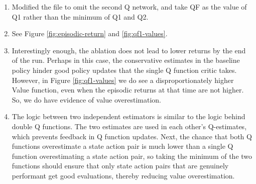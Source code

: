 \documentclass[11pt]{article}
\begin{document}
\begin{enumerate}
    \item[(a)] Modified the file to omit the second Q network, and take QF as the value of Q1 rather than the minimum of Q1 and Q2.
    \item[(b)] See Figure \ref{fig:episodic-return} and \ref{fig:qf1-values}.
    \item[(c)] Interestingly enough, the ablation does not lead to lower returns by the end of the run. Perhaps in this case, the conservative estimates in the baseline policy hinder good policy updates that the single Q function critic takes.
        However, in Figure \ref{fig:qf1-values} we do see a disproportionately higher Value function, even when the episodic returns at that time are not higher.
        So, we do have evidence of value overestimation.
    \item[(d)] The logic between two independent estimators is similar to the logic behind double Q functions.
        The two estimates are used in each other's Q-estimates, which prevents feedback in Q function updates.
        Next, the chance that both Q functions overestimate a state action pair is much lower than a single Q function overestimating a state action pair, so taking the minimum of the two functions should ensure that only state action pairs that are genuinely performant get good evaluations, thereby reducing value overestimation.
\end{enumerate}
\end{document}
